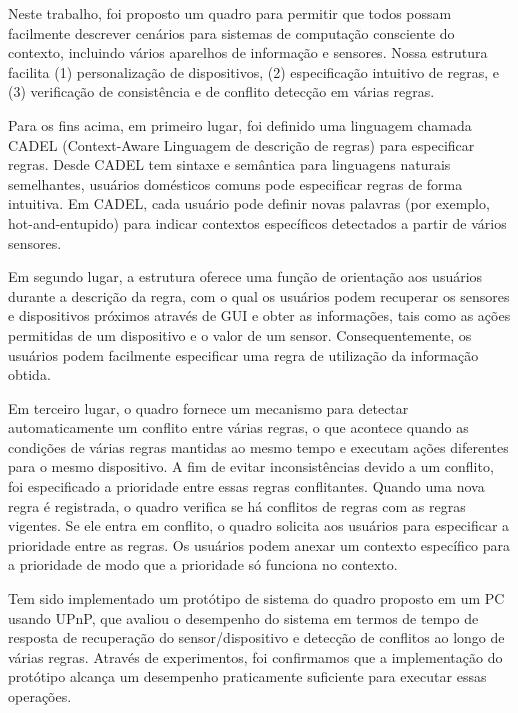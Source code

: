 \documentclass[12pt,a4paper,compsoc]{IEEEtran}
\begin{document}
  Neste trabalho, foi proposto um quadro para permitir que todos possam facilmente descrever
  cenários para sistemas de computação consciente do contexto, incluindo vários aparelhos de
  informação e sensores. Nossa estrutura facilita (1) personalização de dispositivos, (2)
  especificação intuitivo de regras, e (3) verificação de consistência e de conflito detecção em
  várias regras.
  
  Para os fins acima, em primeiro lugar, foi definido uma linguagem chamada CADEL (Context-Aware
  Linguagem de descrição de regras) para especificar regras. Desde CADEL tem sintaxe e semântica
  para linguagens naturais semelhantes, usuários domésticos comuns pode especificar regras de forma
  intuitiva. Em CADEL, cada usuário pode definir novas palavras (por exemplo, hot-and-entupido)
  para indicar contextos específicos detectados a partir de vários sensores.
  
  Em segundo lugar, a estrutura oferece uma função de orientação aos usuários durante a descrição
  da regra, com o qual os usuários podem recuperar os sensores e dispositivos próximos através de
  GUI e obter as informações, tais como as ações permitidas de um dispositivo e o valor de um
  sensor. Consequentemente, os usuários podem facilmente especificar uma regra de utilização da
  informação obtida.
  
  Em terceiro lugar, o quadro fornece um mecanismo para detectar automaticamente um conflito entre
  várias regras, o que acontece quando as condições de várias regras mantidas ao mesmo tempo e
  executam ações diferentes para o mesmo dispositivo. A fim de evitar inconsistências devido a um
  conflito, foi especificado a prioridade entre essas regras conflitantes. Quando uma nova regra é
  registrada, o quadro verifica se há conflitos de regras com as regras vigentes. Se ele entra em
  conflito, o quadro solicita aos usuários para especificar a prioridade entre as regras. Os
  usuários podem anexar um contexto específico para a prioridade de modo que a prioridade só
  funciona no contexto.
  
  Tem sido implementado um protótipo de sistema do quadro proposto em um PC usando UPnP, que
  avaliou o desempenho do sistema em termos de tempo de resposta de recuperação do
  sensor/dispositivo e detecção de conflitos ao longo de várias regras. Através de experimentos,
  foi confirmamos que a implementação do protótipo alcança um desempenho praticamente suficiente
  para executar essas operações.


\end{document}
